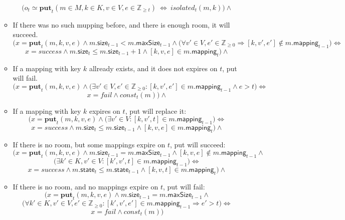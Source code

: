 \documentclass{article}
\renewcommand{\o}[1]{\ensuremath{\mathbf{#1}}}
\newcommand{\p}[1]{\ensuremath{\mathit{#1}}}
\newcommand{\s}[1]{\ensuremath{\mathsf{#1}}}
\newcommand{\nintset}{\ensuremath{\mathds{Z}_{\ge 0}}}
\newcommand{\moreset}[1]{\ensuremath{\mathds{Z}_{\ge #1}}}
\begin{document}
\begin{itemize}
\begin{itemize}
          $$\Big(o_t \simeq \o{put}_t(m\in M, k\in K, v\in V, e\in \moreset{t}) ~\Leftrightarrow~ \p{isolated}_t(m, k)\Big) \wedge$$
        \item If there was no such mupping before, and there is enough room, it will succeed.
          $$\Big(x=\o{put}_t(m, k, v, e) \wedge m.\s{size}_{t-1} < m.\s{maxSize}_{t-1} \wedge \big(\forall v'\in V, e'\in \nintset \Rightarrow [k, v', e'] \not\in m.\s{mapping}_{t-1}\big) \Leftrightarrow $$
          $$ x=success \wedge m.\s{size}_t \le m.\s{size}_{t-1}+1 \wedge [k, v, e] \in m.\s{mapping}_t\Big)\wedge$$
        \item If a mapping with key $k$ allready exists, and it does not expires on $t$, put will fail.
          $$\Big(x=\o{put}_t(m, k, v, e) \wedge \big(\exists v'\in V, e'\in \nintset: [k, v', e']\in m.\s{mapping}_{t-1} \wedge e > t \big) \Leftrightarrow$$
          $$x=fail \wedge \p{const}_t(m)\Big)\wedge$$
        \item If a mapping with key $k$ expires on $t$, put will replace it:
          $$\Big(x=\o{put}_t(m, k, v, e) \wedge \big(\exists v'\in V: [k, v', t]\in m.\s{mapping}_{t-1}\big) \Leftrightarrow$$
          $$ x=success \wedge m.\s{size}_t \le m.\s{size}_{t-1} \wedge [k, v, e] \in m.\s{mapping}_t\Big)\wedge$$
        \item If there is no room, but some mappings expire on $t$, put will succeed:
          $$\Big(x=\o{put}_t(m, k, v, e) \wedge m.\s{size}_{t-1} = m.\s{maxSize}_{t-1} \wedge [k, v, e] \not\in m.\s{mapping}_{t-1} \wedge $$
          $$\big(\exists k'\in K, v'\in V: [k', v', t] \in m.\s{mapping}_{t-1}\big) \Leftrightarrow$$
          $$x=success \wedge m.\s{state}_t \le m.\s{state}_{t-1} \wedge [k, v, t] \in m.\s{mapping}_t\Big)\wedge$$
        \item If there is no room, and no mappings expire on $t$, put will fail:
          $$\Big(x=\o{put}_t(m, k, v, e) \wedge m.\s{size}_{t-1} = m.\s{maxSize}_{t-1} \wedge $$
          $$\big(\forall k'\in K, v'\in V, e' \in \nintset: [k', v', e'] \in m.\s{mapping}_{t-1} \Rightarrow e' > t \big) \Leftrightarrow$$
          $$x=fail \wedge \p{const}_t(m)\Big)$$
      \end{itemize}
     
\end{itemize}
\end{document}
